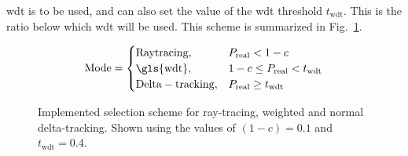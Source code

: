 \gls{wdt} is to be used, and can also set the value of the \gls{wdt}
threshold $t_{\mathrm{wdt}}$. This is the ratio below which \gls{wdt} will be used. This
scheme is summarized in Fig.~\ref{fig:ray_wdt}.
\begin{figure}[hbtp]
  \centering
  \begin{align*}
    \mathrm{Mode} =
    \begin{cases}
      \mathrm{Ray tracing}, & P_\mathrm{real} < 1-c \\
      \mathrm{\gls{wdt}}, & 1-c \leq P_\mathrm{real} < t_{\mathrm{wdt}}
      \\
      \mathrm{Delta-tracking}, & P_\mathrm{real} \geq t_{\mathrm{wdt}}
    \end{cases}
  \end{align*}
  \caption[Implemented selection scheme for ray-tracing, weighted and normal
    delta-tracking.]{Implemented selection scheme for ray-tracing, weighted and normal
    delta-tracking. Shown using the values of $(1-c)=0.1$ and $t_{\mathrm{wdt}}=0.4$.}
  \label{fig:ray_wdt}
\end{figure}




